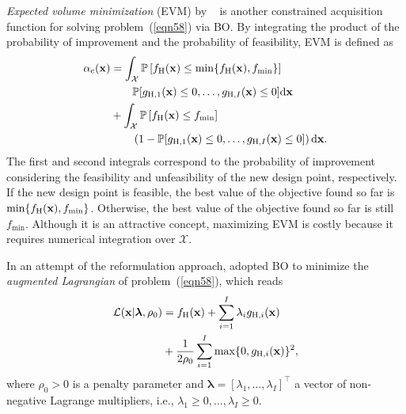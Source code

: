 \documentclass[iicol,sn-basic]{sn-jnl}%
\begin{document}
\textit{Expected volume minimization} (EVM) by ~\cite{Picheny2014} is another constrained acquisition function for solving problem~(\ref{eqn58}) via BO.
By integrating the product of the probability of improvement and the probability of feasibility, EVM is defined as
\begin{equation}\label{eqn62}          
	\begin{aligned}
		\alpha_\text{c}({\bf x}) & = \int_{\mathcal{X}} \mathbb{P}\left[f_\text{H}({\bf x}) \leq \min\{f_\text{H}({\bf x}),f_{\min}\}\right]\\ 
		& \qquad \mathbb{P}[g_{\text{H},1}({\bf x}) \leq 0,\dots,g_{\text{H},I}({\bf x}) \leq 0] \text{d}{\bf x}  \\
		& + \int_{\mathcal{X}} \mathbb{P}\left[f_\text{H}({\bf x}) \leq f_{\min}\right]\\
		& \qquad \left(1-\mathbb{P}[g_{\text{H},1}({\bf x}) \leq 0,\dots,g_{\text{H},I}({\bf x}) \leq 0]\right) \text{d}{\bf x}.
	\end{aligned} 
\end{equation}
The first and second integrals correspond to the probability of improvement considering the feasibility and unfeasibility of the new design point, respectively.
If the new design point is feasible, the best value of the objective found so far is $\min\{f_\text{H}({\bf x}),f_{\min}\}$.
Otherwise, the best value of the objective found so far is still $f_{\min}$.
Although it is an attractive concept, maximizing EVM is costly because it requires numerical integration over $\mathcal{X}$.

In an attempt of the reformulation approach, \cite{Gramacy2016} adopted BO to minimize the \textit{augmented Lagrangian} of problem~(\ref{eqn58}), which reads
\begin{equation}\label{eqn63}
	\begin{aligned}
		\mathcal{L}({\bf x}|\boldsymbol{\lambda},\rho_0) & = f_\text{H}({\bf x}) + \sum_{i=1}^{I} \lambda_i g_{\text{H},i}({\bf x}) \\
		& + \frac{1}{2 \rho_0} \sum_{i=1}^{I} \max\{0,g_{\text{H},i}({\bf x})\}^2, 
	\end{aligned} 
\end{equation}
where  $\rho_0>0$ is a penalty parameter and $\boldsymbol{\lambda}=[\lambda_1,\dots,\lambda_I]^\intercal$ a vector of non-negative Lagrange multipliers, i.e., $\lambda_1 \geq 0,\dots,\lambda_I \geq 0$.
\end{document}
